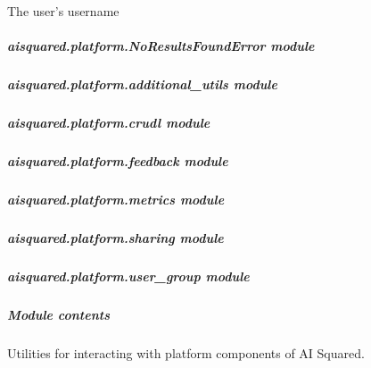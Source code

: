 \documentclass[letterpaper,10pt,english]{sphinxmanual}
\begin{document}
\begin{fulllineitems}

\begin{fulllineitems}
\label{\detokenize{aisquared.platform:aisquared.platform.DatabricksClient.DatabricksClient.username}}
\pysigstartsignatures
{}
\pysigstopsignatures
\sphinxAtStartPar
The user’s username

\end{fulllineitems}


\end{fulllineitems}



\subparagraph{aisquared.platform.NoResultsFoundError module}
\label{\detokenize{aisquared.platform:aisquared-platform-noresultsfounderror-module}}

\subparagraph{aisquared.platform.additional\_utils module}
\label{\detokenize{aisquared.platform:aisquared-platform-additional-utils-module}}

\subparagraph{aisquared.platform.crudl module}
\label{\detokenize{aisquared.platform:aisquared-platform-crudl-module}}

\subparagraph{aisquared.platform.feedback module}
\label{\detokenize{aisquared.platform:aisquared-platform-feedback-module}}

\subparagraph{aisquared.platform.metrics module}
\label{\detokenize{aisquared.platform:aisquared-platform-metrics-module}}

\subparagraph{aisquared.platform.sharing module}
\label{\detokenize{aisquared.platform:aisquared-platform-sharing-module}}

\subparagraph{aisquared.platform.user\_group module}
\label{\detokenize{aisquared.platform:aisquared-platform-user-group-module}}

\subparagraph{Module contents}
\label{\detokenize{aisquared.platform:module-aisquared.platform}}\label{\detokenize{aisquared.platform:module-contents}}
\sphinxAtStartPar
Utilities for interacting with platform components of AI Squared.

\sphinxstepscope
\end{document}
